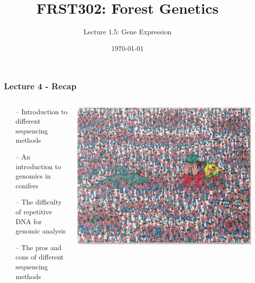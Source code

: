 \documentclass{beamer}
\title{\Huge FRST302: Forest Genetics}
\author{\Large Lecture 1.5: Gene Expression}
\date{\today}
\begin{document}
	\maketitle
	
	
	\begin{frame}
		\frametitle{Lecture 4 - Recap }
			\begin{columns}
				\begin{column}{0.5\textwidth}
		\begin{itemize}
			\item[--] Introduction to different sequencing methods
			\item[--] An introduction to genomics in conifers
			\item[--] The difficulty of repetitive DNA for genomic analysis
			\item[--] The pros and cons of different sequencing methods
		\end{itemize}
		\end{column}
	\begin{column}{0.5\textwidth}
				\centering	\includegraphics[keepaspectratio, width  = \textwidth]{img/waldo}\\
		\end{column}
		\end{columns}

\end{frame}
	
\end{document}
